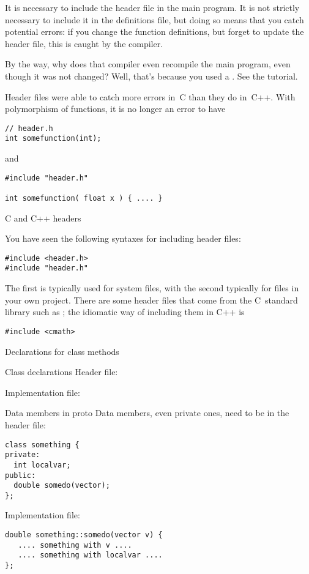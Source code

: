 It is necessary to include the header file in the main program. It is
not strictly necessary to include it in the definitions file, but
doing so means that you catch potential errors: if you change the
function definitions, but forget to update the header file, this is
caught by the compiler.

\begin{remark}
  By the way, why does that compiler even recompile the main program,
  even though it was not changed? Well, that's because you used a
  . See the tutorial.
\end{remark}
\begin{remark}
  Header files were able to catch more errors in~C than they do
  in~C++. With polymorphism of functions, it is no longer an error to
  have 
\begin{lstlisting}
// header.h
int somefunction(int);
\end{lstlisting}
and
\begin{lstlisting}
#include "header.h"

int somefunction( float x ) { .... }
\end{lstlisting}
\end{remark}

 {C and C++ headers}

You have seen the following syntaxes for including header files:
\begin{lstlisting}
#include <header.h>
#include "header.h"
\end{lstlisting}
The first is typically used for system files, with the second
typically for files in your own project. There are some header files
that come from the C~standard library such as ; the
idiomatic way of including them in C++ is
\begin{lstlisting}
#include <cmath>
\end{lstlisting}

 {Declarations for class methods}

\begin{block}{Class declarations}
  \label{sl:class-proto}
  Header file:

  Implementation file:
\end{block}

\begin{block}{Data members in proto}
  \label{sl:class-proto-private}
  Data members, even private ones, need to be in the header file:
\begin{lstlisting}
class something {
private:
  int localvar;
public:
  double somedo(vector);
};
\end{lstlisting}
Implementation file:
\begin{lstlisting}
double something::somedo(vector v) {
   .... something with v ....
   .... something with localvar ....
};
\end{lstlisting}
\end{block}

